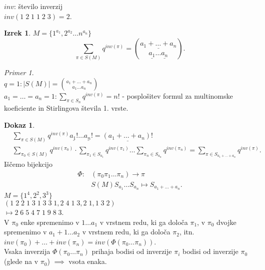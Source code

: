 \documentclass[a4paper, 12pt]{book}
\theoremstyle{definition}
\newtheorem{theorem}[counter]{Izrek}
\newtheorem{pro}[counter]{Dokaz}
\theoremstyle{remark}
\newtheorem*{ex}{Primer}
\begin{document}
$inv$: število inverzij \\
$inv(1 \; 2 \; 1 \; 1 \; 2 \; 3) = 2$.
\begin{theorem}
  $M = \{1^{a_1}, 2^{a_2} \dots n^{a_n}\}$
  \begin{equation*}
    \sum_{\pi \in S(M)} q^{inv(\pi)} = \binom{\underline{a_1 + \dots + a_n}}{\underline{a_1} \dots \underline{a_n}}.
  \end{equation*}
\end{theorem}
\begin{ex} \text{} \\
  $q = 1: |S(M)| = \binom{a_1 + \dots + a_n}{a_1 \dots a_n}$ \\
  $a_1 = \dots = a_n = 1: \sum_{\pi \in S_n} q^{inv(\pi)} = n!$ - posplošitev formul za multinomske koeficiente
  in Stirlingova števila 1. vrste.
\end{ex}
\begin{pro}
  \begin{align*}
    &\sum_{\pi \in S(M)} q^{inv(\pi)} \underline{a_1!} \dots \underline{a_n!} = \underline{(a_1 + \dots + a_n)!} \\
    &\sum_{\pi_0 \in S(M)} q^{inv(\pi_0)} \cdot \sum_{\pi_1 \in S_{a_1}} q^{inv(\pi_1)} \dots
      \sum_{\pi_n \in S_{a_n}} q^{inv(\pi_n)} = \sum_{\pi \in S_{a_1 + \dots + a_n}} q^{inv(\pi)}.
  \end{align*}
  Iščemo bijekcijo
  \begin{align*}
    \Phi: &(\pi_0 \pi_1 \dots \pi_n) \to \pi \\
    &S(M) S_{a_1} \dots S_{a_n} \mapsto S_{a_1 + \dots + a_n}.
  \end{align*}
  $M = \{1^4, 2^2, 3^3\}$ \\
  $(1 \; 2 \; 2 \; 1 \; 3 \; 1 \; 3 \; 3 \; 1, 2 \; 4 \; 1 \; 3, 2 \; 1, 1 \; 3 \; 2)$ \\
  $\mapsto 2 \; 6 \; 5 \; 4 \; 7 \; 1 \; 9 \; 8 \; 3$. \\
  V $\pi_0$ enke spremenimo v $1 \dots a_1$ v vrstnem redu, ki ga določa $\pi_1$,
  v $\pi_0$ dvojke spremenimo v $a_1+1 \dots a_2$ v vrstnem redu, ki ga določa $\pi_2$, itn. \\
  $inv(\pi_0) + \dots + inv(\pi_n) = inv(\Phi(\pi_0 \dots \pi_n))$. \\
  Vsaka inverzija $\Phi(\pi_0 \dots \pi_n)$ prihaja bodisi od inverzije $\pi_i$ bodisi od inverzije $\pi_0$
  (glede na  v $\pi_0$) $\implies$ vsota enaka.
\end{pro}
\end{document}
